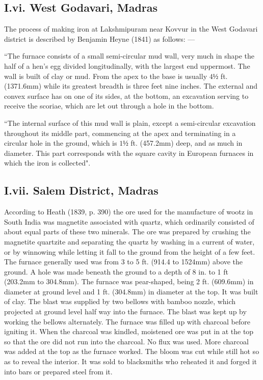 \vspace{-.1cm}

\subsection*{I.vi. West Godavari, Madras}\label{subsection-6}

\vspace{-.2cm}

The process of making iron at Lakshmipuram near Kovvur in the West Godavari district is described by Benjamin Heyne (1841) as follows: — 

\footnotesize{“The furnace consists of a small semi-circular mud wall, very much in shape the half of a hen’s egg divided longitudinally, with the largest end uppermost. The wall is built of clay or mud. From the apex to the base is usually $4½$ ft. (1371.6mm) while its greatest breadth is three feet nine inches. The external and convex surface has on one of its sides, at the bottom, an excavation serving to receive the scoriae, which are let out through a hole in the bottom.}

\footnotesize{``The internal surface of this mud wall is plain, except a semi-circular excavation throughout its middle part, commencing at the apex and terminating in a circular hole in the ground, which is $1½$ ft. (457.2mm) deep, and as much in diameter. This part corresponds with the square cavity in European furnaces in which the iron is collected".} 

\vspace{-.3cm}

\subsection*{I.vii.  Salem District, Madras}\label{subsection-7}

\vspace{-.2cm}

According to Heath (1839, p. 390) the ore used for the manufacture of wootz in South India was magnetite associated with quartz, which ordinarily consisted of about equal parts of these two minerals. The ore was prepared by crushing the magnetite quartzite and separating the quartz by washing in a current of water, or by winnowing while letting it fall to the ground from the height of a few feet. The furnace generally used was from 3 to 5 ft. (914.4 to 1524mm) above the ground. A hole was made beneath the ground to a depth of 8 in. to 1 ft (203.2mm to 304.8mm). The furnace was pear-shaped, being 2 ft. (609.6mm) in diameter at ground level and 1 ft. (304.8mm) in diameter at the top. It was built of clay. The blast was supplied by two bellows with bamboo nozzle, which projected at ground level half way into the furnace. The blast was kept up by working the bellows alternately. The furnace was filled up with charcoal before igniting it. When the charcoal was kindled, moistened ore was put in at the top so that the ore did not run into the charcoal. No flux was used.  More charcoal was added at the top as the furnace worked.  The bloom was cut while still hot so as to reveal the interior. It was sold to blacksmiths who reheated it and forged it into bars or prepared steel from it.

